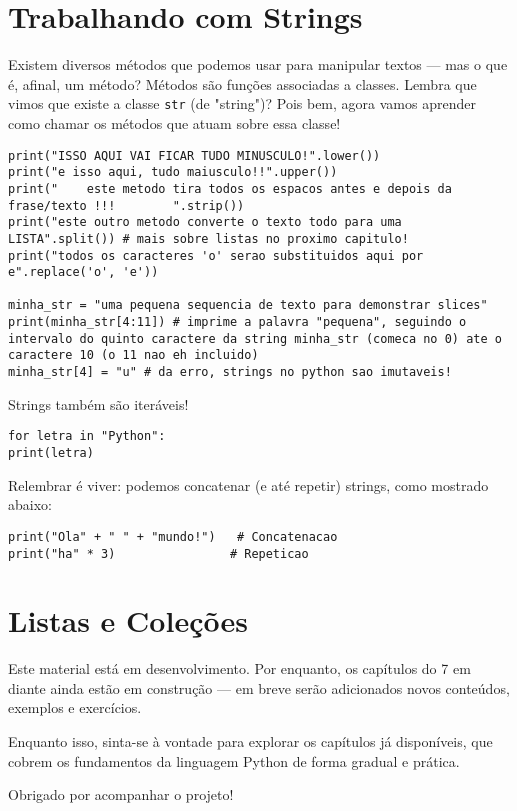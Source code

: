 \documentclass[12pt]{book}
\begin{document}
	\chapter{Trabalhando com Strings}
	
	Existem diversos métodos que podemos usar para manipular textos — mas o que é, afinal, um método?  
	Métodos são funções associadas a classes. Lembra que vimos que existe a classe \texttt{str} (de "string")? Pois bem, agora vamos aprender como chamar os métodos que atuam sobre essa classe!

	
	\begin{lstlisting}[caption={Métodos com string}]
print("ISSO AQUI VAI FICAR TUDO MINUSCULO!".lower())
print("e isso aqui, tudo maiusculo!!".upper())
print("    este metodo tira todos os espacos antes e depois da frase/texto !!!        ".strip())
print("este outro metodo converte o texto todo para uma LISTA".split()) # mais sobre listas no proximo capitulo!
print("todos os caracteres 'o' serao substituidos aqui por e".replace('o', 'e'))

minha_str = "uma pequena sequencia de texto para demonstrar slices"
print(minha_str[4:11]) # imprime a palavra "pequena", seguindo o intervalo do quinto caractere da string minha_str (comeca no 0) ate o caractere 10 (o 11 nao eh incluido)
minha_str[4] = "u" # da erro, strings no python sao imutaveis!\end{lstlisting}

	Strings também são iteráveis!

	\begin{lstlisting}[caption={Iterando sobre strings}]
for letra in "Python":
print(letra)
\end{lstlisting}

	Relembrar é viver: podemos concatenar (e até repetir) strings, como mostrado abaixo:

	\begin{lstlisting}[caption={Concatenação e repetição de strings}]
print("Ola" + " " + "mundo!")   # Concatenacao
print("ha" * 3)                # Repeticao
\end{lstlisting}

	\chapter{Listas e Coleções}
	
	\begin{tcolorbox}[colback=yellow!10, colframe=black, title={\large\bfseries Nota ao leitor}]
		Este material está em desenvolvimento. Por enquanto, os capítulos do 7 em diante ainda estão em construção — em breve serão adicionados novos conteúdos, exemplos e exercícios.
		
		Enquanto isso, sinta-se à vontade para explorar os capítulos já disponíveis, que cobrem os fundamentos da linguagem Python de forma gradual e prática.
		
		Obrigado por acompanhar o projeto!
	\end{tcolorbox}
	
\end{document}
